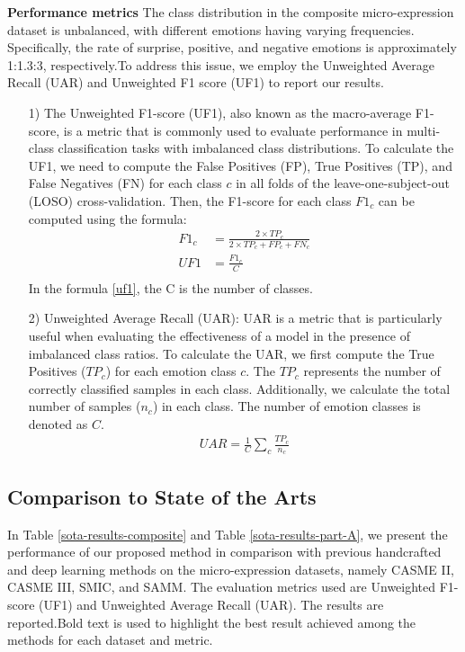 \documentclass[review,12pt, 3p]{elsarticle}
\begin{document}
\textbf{Performance metrics}
The class distribution in the composite micro-expression dataset is unbalanced, with different emotions having varying frequencies. Specifically, the rate of surprise, positive, and negative emotions is approximately 1:1.3:3, respectively.To address this issue, we employ the Unweighted Average Recall (UAR) and Unweighted F1 score (UF1) to report our results. 

\begin{itemize}
  \item [1) ] The Unweighted F1-score (UF1), also known as the macro-average F1-score, is a metric that is commonly used to evaluate performance in multi-class classification tasks with imbalanced class distributions. To calculate the UF1, we need to compute the False Positives (FP), True Positives (TP), and False Negatives (FN) for each class $c$ in all folds of the leave-one-subject-out (LOSO) cross-validation. Then, the F1-score for each class $F1_c$ can be computed using the formula:
\begin{equation}
\begin{aligned}
F1_c &=\frac{2\times TP_c}{2\times TP_c +FP_c +FN_c}\\
UF1 &=\frac{F1_c}{C}\\
\end{aligned}
\label{uf1}
\end{equation}
In the formula \ref{uf1}, the C is the number of classes.
  
  \item [2) ] Unweighted Average Recall (UAR): UAR is a metric that is particularly useful when evaluating the effectiveness of a model in the presence of imbalanced class ratios. To calculate the UAR, we first compute the True Positives ($TP_c$) for each emotion class $c$. The $TP_c$ represents the number of correctly classified samples in each class. Additionally, we calculate the total number of samples ($n_c$) in each class. The number of emotion classes is denoted as $C$.
 \begin{equation}
\begin{aligned}
UAR = \frac{1}{C}\sum_{c}{\frac{TP_c}{n_c}}
\end{aligned}
\label{uar}
\end{equation}
\end{itemize}

\subsection {Comparison to State of the Arts}
In Table \ref{sota-results-composite} and Table \ref{sota-results-part-A}, we present the performance of our proposed method in comparison with previous handcrafted and deep learning methods on the micro-expression datasets, namely CASME II, CASME III, SMIC, and SAMM. The evaluation metrics used are Unweighted F1-score (UF1) and Unweighted Average Recall (UAR). The results are reported.Bold text is used to highlight the best result achieved among the methods for each dataset and metric.
\end{document}
